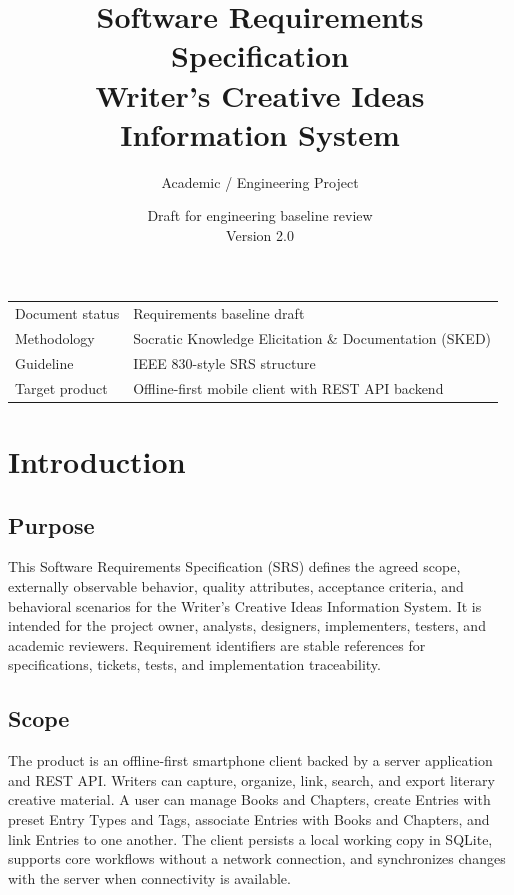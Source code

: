 \documentclass[11pt,a4paper]{article}
\title{Software Requirements Specification\\[0.4em]
\large Writer's Creative Ideas Information System}
\author{Academic / Engineering Project}
\date{Draft for engineering baseline review\\Version 2.0}
\begin{document}
\maketitle
\thispagestyle{empty}

\begin{center}
\begin{tabular}{ll}
\toprule
Document status & Requirements baseline draft \\
Methodology & Socratic Knowledge Elicitation \& Documentation (SKED) \\
Guideline & IEEE 830-style SRS structure \\
Target product & Offline-first mobile client with REST API backend \\
\bottomrule
\end{tabular}
\end{center}

\clearpage
\tableofcontents
\clearpage

\section{Introduction}

\subsection{Purpose}
This Software Requirements Specification (SRS) defines the agreed scope, externally observable behavior, quality attributes, acceptance criteria, and behavioral scenarios for the Writer's Creative Ideas Information System. It is intended for the project owner, analysts, designers, implementers, testers, and academic reviewers. Requirement identifiers are stable references for specifications, tickets, tests, and implementation traceability.

\subsection{Scope}
The product is an offline-first smartphone client backed by a server application and REST API. Writers can capture, organize, link, search, and export literary creative material. A user can manage Books and Chapters, create Entries with preset Entry Types and Tags, associate Entries with Books and Chapters, and link Entries to one another. The client persists a local working copy in SQLite, supports core workflows without a network connection, and synchronizes changes with the server when connectivity is available.
\end{document}
